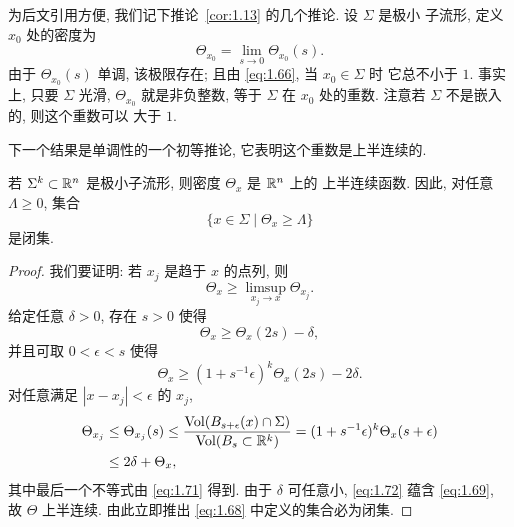 为后文引用方便, 我们记下推论~\ref{cor:1.13} 的几个推论. 设 $\Sigma$ 是极小
子流形, 定义 $x_0$ 处的密度为
\begin{equation}
\Theta_{x_0}=\lim_{s\to0}\Theta_{x_0}(s).
\label{eq:1.67}
\end{equation}
由于 $\Theta_{x_0}(s)$ 单调, 该极限存在; 且由 \eqref{eq:1.66}, 当 $x_0\in\Sigma$ 时
它总不小于 $1$. 事实上, 只要 $\Sigma$ 光滑, $\Theta_{x_0}$ 就是非负整数,
等于 $\Sigma$ 在 $x_0$ 处的重数. 注意若 $\Sigma$ 不是嵌入的, 则这个重数可以
大于 $1$.

下一个结果是单调性的一个初等推论, 它表明这个重数是上半连续的.

\begin{corollary}
\label{cor:1.14}
若 $\Sigma^k\subset\mathbb{R}^n$ 是极小子流形, 则密度 $\Theta_x$ 是 $\mathbb{R}^n$ 上的
上半连续函数. 因此, 对任意 $\Lambda\geq0$, 集合
\begin{equation}
\{x\in\Sigma\mid\Theta_x\geq\Lambda\}
\label{eq:1.68}
\end{equation}
是闭集.
\end{corollary}

\begin{proof}
我们要证明: 若 $x_j$ 是趋于 $x$ 的点列, 则
\begin{equation}
\Theta_x\geq\limsup_{x_j\to x}\Theta_{x_j}.
\label{eq:1.69}
\end{equation}
给定任意 $\delta>0$, 存在 $s>0$ 使得
\begin{equation}
\Theta_x\geq\Theta_x(2s)-\delta,
\label{eq:1.70}
\end{equation}
并且可取 $0<\epsilon<s$ 使得
\begin{equation}
\Theta_x\geq(1+s^{-1}\epsilon)^k\Theta_x(2s)-2\delta.
\label{eq:1.71}
\end{equation}
对任意满足 $|x-x_j|<\epsilon$ 的 $x_j$,
\begin{equation}
\begin{aligned}
\Theta_{x_j}&\leq\Theta_{x_j}(s)
 \leq\frac{\operatorname{Vol}(B_{s+\epsilon}(x)\cap\Sigma)}{\operatorname{Vol}(B_s\subset\mathbb{R}^k)}
 =(1+s^{-1}\epsilon)^k\Theta_x(s+\epsilon)\\
&\leq2\delta+\Theta_x,
\end{aligned}
\label{eq:1.72}
\end{equation}
其中最后一个不等式由 \eqref{eq:1.71} 得到. 由于 $\delta$ 可任意小, \eqref{eq:1.72} 蕴含
\eqref{eq:1.69}, 故 $\Theta$ 上半连续. 由此立即推出 \eqref{eq:1.68} 中定义的集合必为闭集.
\end{proof}



